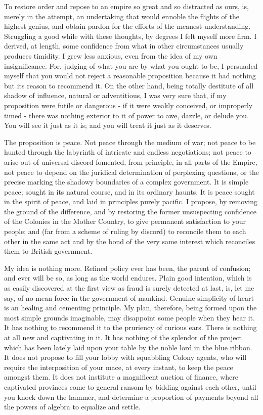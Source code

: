 To restore order and repose to an empire so great and so distracted as ours, is, merely in the attempt, an undertaking that would ennoble the flights of the highest genius, and obtain pardon for the efforts of the meanest understanding. Struggling a good while with these thoughts, by degrees I felt myself more firm. I derived, at length, some confidence from what in other circumstances usually produces timidity. I grew less anxious, even from the idea of my own insignificance. For, judging of what you are by what you ought to be, I persuaded myself that you would not reject a reasonable proposition because it had nothing but its reason to recommend it. On the other hand, being totally destitute of all shadow of influence, natural or adventitious, I was very sure that, if my proposition were futile or dangerous - if it were weakly conceived, or improperly timed - there was nothing exterior to it of power to awe, dazzle, or delude you. You will see it just as it is; and you will treat it just as it deserves.\par

The proposition is peace. Not peace through the medium of war; not peace to be hunted through the labyrinth of intricate and endless negotiations; not peace to arise out of universal discord fomented, from principle, in all parts of the Empire, not peace to depend on the juridical determination of perplexing questions, or the precise marking the shadowy boundaries of a complex government. It is simple peace; sought in its natural course, and in its ordinary haunts. It is peace sought in the spirit of peace, and laid in principles purely pacific. I propose, by removing the ground of the difference, and by restoring the former unsuspecting confidence of the Colonies in the Mother Country, to give permanent satisfaction to your people; and (far from a scheme of ruling by discord) to reconcile them to each other in the same act and by the bond of the very same interest which reconciles them to British government.\par

My idea is nothing more. Refined policy ever has been, the parent of confusion; and ever will be so, as long as the world endures. Plain good intention, which is as easily discovered at the first view as fraud is surely detected at last, is, let me say, of no mean force in the government of mankind. Genuine simplicity of heart is an healing and cementing principle. My plan, therefore, being formed upon the most simple grounds imaginable, may disappoint some people when they hear it. It has nothing to recommend it to the pruriency of curious ears. There is nothing at all new and captivating in it. It has nothing of the splendor of the project which has been lately laid upon your table by the noble lord in the blue ribbon. It does not propose to fill your lobby with squabbling Colony agents, who will require the interposition of your mace, at every instant, to keep the peace amongst them. It does not institute a magnificent auction of finance, where captivated provinces come to general ransom by bidding against each other, until you knock down the hammer, and determine a proportion of payments beyond all the powers of algebra to equalize and settle.\par

